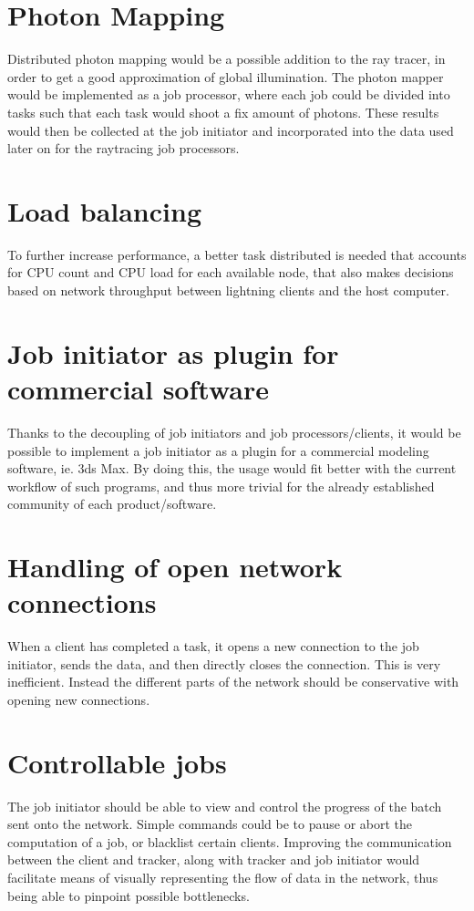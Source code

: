\section{Photon Mapping}
Distributed photon mapping would be a possible addition to the ray tracer,
in order to get a good approximation of global illumination. The photon
mapper would be implemented as a job processor, where each job could be
divided into tasks such that each task would shoot a fix amount of photons.
These results would then be collected at the job initiator and incorporated
into the data used later on for the raytracing job processors. 

\section{Load balancing}
To further increase performance, a better task distributed is needed that 
accounts for CPU count and CPU load for each available node, that also makes
decisions based on network throughput between lightning clients and the host
computer.

\section{Job initiator as plugin for commercial software}
Thanks to the decoupling of job initiators and job processors/clients, it
would be possible to implement a job initiator as a plugin for a commercial
modeling software, ie. 3ds Max. By doing this, the usage would fit better
with the current workflow of such programs, and thus more trivial for the
already established community of each product/software.

\section{Handling of open network connections}
When a client has completed a task, it opens a new connection to the job
initiator, sends the data, and then directly closes the connection.
This is very inefficient. Instead the different parts of the network should
be conservative with opening new connections.

\section{Controllable jobs}
The job initiator should be able to view and control the progress of the batch
sent onto the network. Simple commands could be to pause or abort the
computation of a job, or blacklist certain clients. Improving the communication
between the client and tracker, along with tracker and job initiator would
facilitate means of visually representing the flow of data in the network, thus
being able to pinpoint possible bottlenecks.


